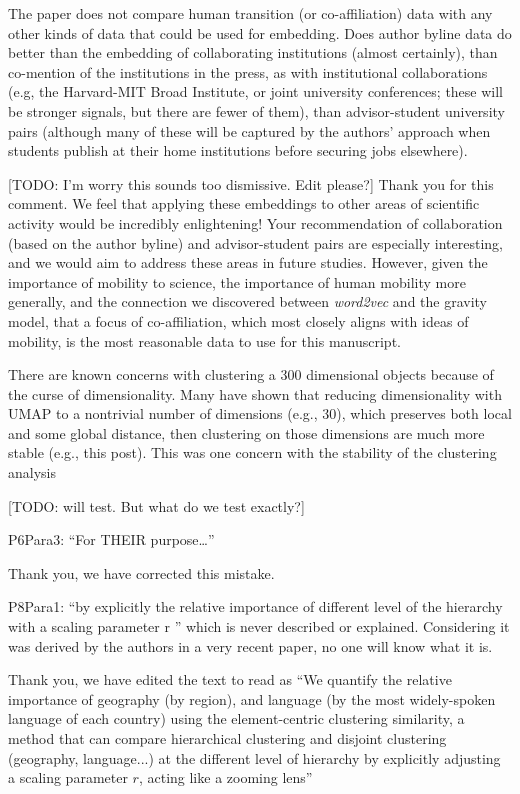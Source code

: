 \documentclass[12pt,a4paper]{article}
\newcommand{\todo}[1]{{\leavevmode\color{orange}[TODO: #1]}}
\newcommand{\response}[1]{{\leavevmode\noindent #1}}
\newcommand{\rcomment}[1]{%
\vspace{10pt}
\begin{tcolorbox}[colback=black!3,colframe=white!45!black]
#1
\end{tcolorbox}
}
\begin{document}
\rcomment{
The paper does not compare human transition (or co-affiliation) data with any other kinds of
data that could be used for embedding. Does author byline data do better than the embedding
of collaborating institutions (almost certainly), than co-mention of the institutions in the press, as
with institutional collaborations (e.g, the Harvard-MIT Broad Institute, or joint university
conferences; these will be stronger signals, but there are fewer of them), than advisor-student
university pairs (although many of these will be captured by the authors’ approach when
students publish at their home institutions before securing jobs elsewhere).
}

\response{
\todo{I'm worry this sounds too dismissive. Edit please?}
Thank you for this comment. 
We feel that applying these embeddings to other areas of scientific activity would be incredibly enlightening! 
Your recommendation of collaboration (based on the author byline) and advisor-student pairs are especially interesting, and we would aim to address these areas in future studies. 
However, given the importance of mobility to science, the importance of human mobility more generally, and the connection we discovered between \textit{word2vec} and the gravity model, that a focus of co-affiliation, which most closely aligns with ideas of mobility, is the most reasonable data to use for this manuscript. 
}


\rcomment{
There are known concerns with clustering a 300 dimensional objects because of the curse of
dimensionality. Many have shown that reducing dimensionality with UMAP to a nontrivial
number of dimensions (e.g., 30), which preserves both local and some global distance, then
clustering on those dimensions are much more stable (e.g., this post). This was one
concern with the stability of the clustering analysis


}

\response{
\todo{will test. But what do we test exactly?}
}

\rcomment{
P6Para3: “For THEIR purpose…”
}

\response{
Thank you, we have corrected this mistake. 
}

\rcomment{
P8Para1: “by explicitly the relative importance of different level of the hierarchy with a scaling parameter r ” which is never described or explained. Considering it was derived by the authors in a very recent paper, no one will know what it is.
}

\response{
Thank you, we have edited the text to read as “We quantify the relative importance of geography (by region), and language (by the most widely-spoken language of each country) using the element-centric clustering similarity, a method that can compare hierarchical clustering and disjoint clustering (geography, language...) at the different level of hierarchy by explicitly adjusting a scaling parameter $r$, acting like a zooming lens”
}
\end{document}
